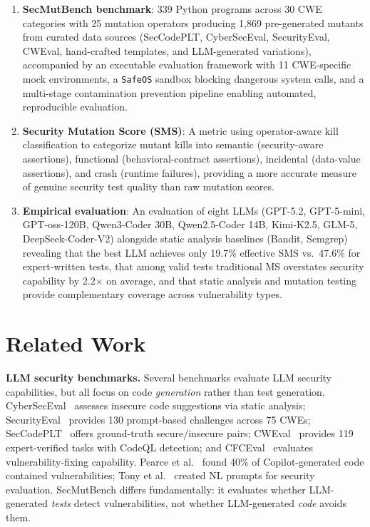 \documentclass[sigconf,anonymous,review]{acmart}
\begin{document}
\begin{enumerate}
    \item \textbf{SecMutBench benchmark}: 339 Python programs across 30 CWE categories with 25 mutation operators producing 1,869 pre-generated mutants from curated data sources (SecCodePLT, CyberSecEval, SecurityEval, CWEval, hand-crafted templates, and LLM-generated variations), accompanied by an executable evaluation framework with 11 CWE-specific mock environments, a \texttt{SafeOS} sandbox blocking dangerous system calls, and a multi-stage contamination prevention pipeline enabling automated, reproducible evaluation.

    \item \textbf{Security Mutation Score (SMS)}: A metric using operator-aware kill classification to categorize mutant kills into semantic (security-aware assertions), functional (behavioral-contract assertions), incidental (data-value assertions), and crash (runtime failures), providing a more accurate measure of genuine security test quality than raw mutation scores.

    \item \textbf{Empirical evaluation}: An evaluation of eight LLMs (GPT-5.2, GPT-5-mini, GPT-oss-120B, Qwen3-Coder 30B, Qwen2.5-Coder 14B, Kimi-K2.5, GLM-5, DeepSeek-Coder-V2) alongside static analysis baselines (Bandit, Semgrep) revealing that the best LLM achieves only 19.7\% effective SMS vs.\ 47.6\% for expert-written tests, that among valid tests traditional MS overstates security capability by 2.2$\times$ on average, and that static analysis and mutation testing provide complementary coverage across vulnerability types.
\end{enumerate}


\section{Related Work}\label{sec:related}

\textbf{LLM security benchmarks.} Several benchmarks evaluate LLM security capabilities, but all focus on code \emph{generation} rather than test generation. CyberSecEval~\cite{bhatt2023cyberseceval} assesses insecure code suggestions via static analysis; SecurityEval~\cite{siddiq2022securityeval} provides 130 prompt-based challenges across 75 CWEs; SecCodePLT~\cite{secccodeplt2024} offers ground-truth secure/insecure pairs; CWEval~\cite{yang2024cweval} provides 119 expert-verified tasks with CodeQL detection; and CFCEval~\cite{cheng2025cfceval} evaluates vulnerability-fixing capability. Pearce et al.~\cite{pearce2022asleep} found 40\% of Copilot-generated code contained vulnerabilities; Tony et al.~\cite{tony2023llmseceval} created NL prompts for security evaluation. SecMutBench differs fundamentally: it evaluates whether LLM-generated \emph{tests} detect vulnerabilities, not whether LLM-generated \emph{code} avoids them.
\end{document}
